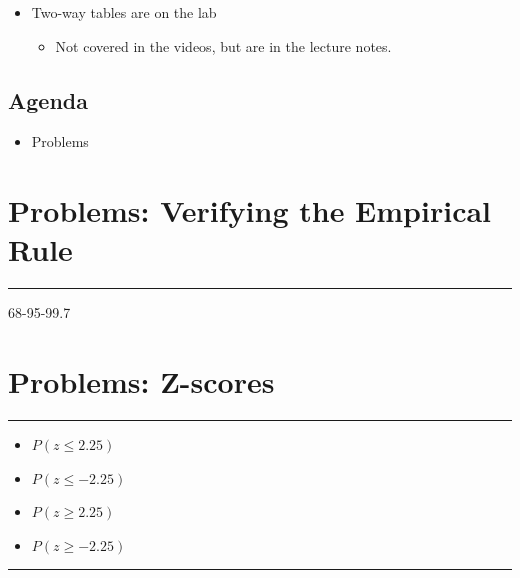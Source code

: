 \documentclass[
  letterpaper,
  DIV=11,
  numbers=noendperiod]{scrreprt}
\providecommand{\tightlist}{%
  \setlength{\itemsep}{0pt}\setlength{\parskip}{0pt}}\usepackage{longtable,booktabs,array}
\begin{document}
\begin{itemize}
\tightlist
\item
  Two-way tables are on the lab

  \begin{itemize}
  \tightlist
  \item
    Not covered in the videos, but are in the lecture notes.\lspace
  \end{itemize}
\end{itemize}

\hypertarget{agenda-4}{%
\section{Agenda}\label{agenda-4}}

\begin{itemize}
\tightlist
\item
  Problems
\end{itemize}

\hypertarget{problems-verifying-the-empirical-rule}{%
\chapter{Problems: Verifying the Empirical
Rule}\label{problems-verifying-the-empirical-rule}}

\begin{center}\rule{0.5\linewidth}{0.5pt}\end{center}

68-95-99.7

\hypertarget{problems-z-scores}{%
\chapter{Problems: Z-scores}\label{problems-z-scores}}

\begin{center}\rule{0.5\linewidth}{0.5pt}\end{center}

\begin{itemize}
\tightlist
\item
  \(P(z \le 2.25)\)
\item
  \(P(z \le -2.25)\)
\item
  \(P(z \ge 2.25)\)
\item
  \(P(z \ge -2.25)\)
\end{itemize}

\begin{center}\rule{0.5\linewidth}{0.5pt}\end{center}
\end{document}
